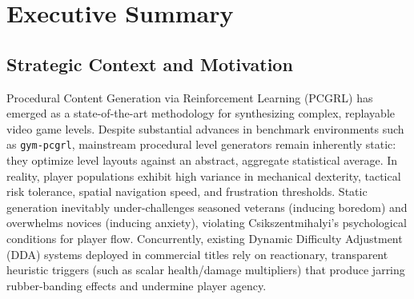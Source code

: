 \chapter*{Executive Summary}

\section*{Strategic Context and Motivation}
Procedural Content Generation via Reinforcement Learning (PCGRL) has emerged as a state-of-the-art methodology for synthesizing complex, replayable video game levels. Despite substantial advances in benchmark environments such as \texttt{gym-pcgrl}, mainstream procedural level generators remain inherently static: they optimize level layouts against an abstract, aggregate statistical average. In reality, player populations exhibit high variance in mechanical dexterity, tactical risk tolerance, spatial navigation speed, and frustration thresholds. Static generation inevitably under-challenges seasoned veterans (inducing boredom) and overwhelms novices (inducing anxiety), violating Csikszentmihalyi's psychological conditions for player flow. Concurrently, existing Dynamic Difficulty Adjustment (DDA) systems deployed in commercial titles rely on reactionary, transparent heuristic triggers (such as scalar health/damage multipliers) that produce jarring rubber-banding effects and undermine player agency.

